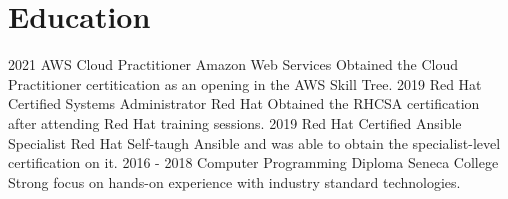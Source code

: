 \documentclass[]{friggeri-cv}
\begin{document}
\section{Education}
\begin{entrylist}
  \entry
    {2021}
    {AWS Cloud Practitioner}
    {Amazon Web Services}
    {Obtained the Cloud Practitioner certitication as an opening in the AWS Skill Tree.}
  \entry
    {2019}
    {Red Hat Certified Systems Administrator}
    {Red Hat}
    {Obtained the RHCSA certification after attending Red Hat training sessions.}
  \entry
    {2019}
    {Red Hat Certified Ansible Specialist}
    {Red Hat}
    {Self-taugh Ansible and was able to obtain the specialist-level certification on it.}
  \entry
    {2016 - 2018}
    {Computer Programming Diploma}
    {Seneca College}
    {Strong focus on hands-on experience with industry standard technologies.}
\end{entrylist}
\end{document}

